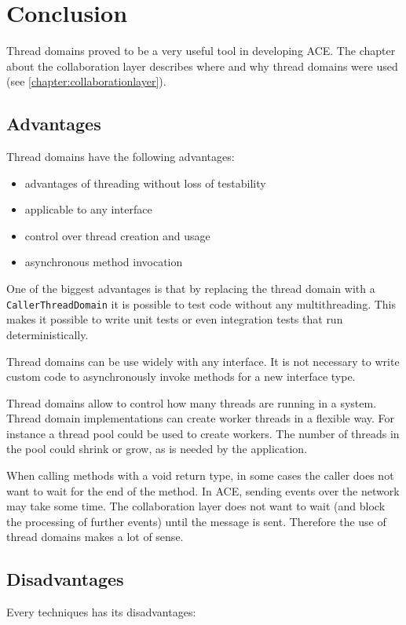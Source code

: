 \section{Conclusion}

Thread domains proved to be a very useful tool in developing ACE. The
chapter about the collaboration layer describes where and why thread
domains were used (see \ref{chapter:collaborationlayer}).


\subsection{Advantages}
Thread domains have the following advantages:

\begin{itemize}
 \item advantages of threading without loss of testability
 \item applicable to any interface
 \item control over thread creation and usage
 \item asynchronous method invocation
\end{itemize}

One of the biggest advantages is that by replacing the thread domain with
a \texttt{CallerThreadDomain} it is possible to test code without any
multithreading. This makes it possible to write unit tests or even 
integration tests that run deterministically.

Thread domains can be use widely with any interface. It is not necessary to
write custom code to asynchronously invoke methods for a new interface type.

Thread domains allow to control how many threads are running in a system.
Thread domain implementations can create worker threads in a flexible way. For
instance a thread pool could be used to create workers. The number of
threads in the pool could shrink or grow, as is needed by the application.

When calling methods with a void return type,
in some cases the caller does not want to wait for the end of the method.
In ACE, sending events over the network may take some time. The collaboration
layer does not want to wait (and block the processing of further events)
until the message is sent. Therefore the use of thread domains makes a
lot of sense.


\subsection{Disadvantages}
Every techniques has its disadvantages:

